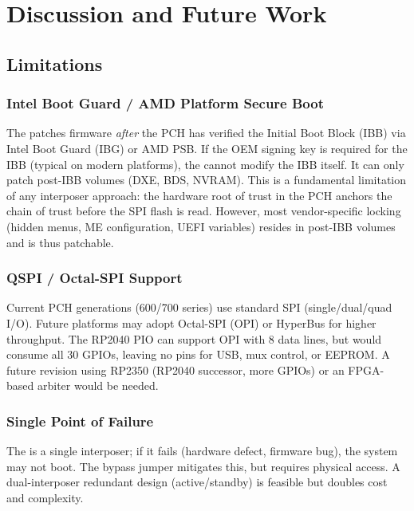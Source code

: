 \section{Discussion and Future Work}
\label{sec:discussion}

\subsection{Limitations}

\subsubsection{Intel Boot Guard / AMD Platform Secure Boot}
The \vbfc patches firmware \textit{after} the \ac{PCH} has verified the Initial Boot Block (IBB) via Intel Boot Guard (IBG) or AMD PSB. If the OEM signing key is required for the IBB (typical on modern platforms), the \vbfc cannot modify the IBB itself. It can only patch post-IBB volumes (DXE, BDS, NVRAM). This is a fundamental limitation of any interposer approach: the hardware root of trust in the \ac{PCH} anchors the chain of trust before the \ac{SPI} flash is read. However, most vendor-specific locking (hidden menus, \ac{ME} configuration, \ac{UEFI} variables) resides in post-IBB volumes and is thus patchable.

\subsubsection{QSPI / Octal-SPI Support}
Current \ac{PCH} generations (600/700 series) use standard \ac{SPI} (single/dual/quad I/O). Future platforms may adopt Octal-SPI (OPI) or HyperBus for higher throughput. The RP2040 \ac{PIO} can support OPI with 8 data lines, but would consume all 30 GPIOs, leaving no pins for USB, mux control, or EEPROM. A future revision using RP2350 (RP2040 successor, more GPIOs) or an FPGA-based arbiter would be needed.

\subsubsection{Single Point of Failure}
The \vbfc is a single interposer; if it fails (hardware defect, firmware bug), the system may not boot. The bypass jumper mitigates this, but requires physical access. A dual-interposer redundant design (active/standby) is feasible but doubles cost and complexity.

